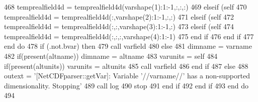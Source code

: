 \begin{DoxyCode}
468                             temprealfield4d = temprealfield4d(varshape(1):1:-1,:,:,:)
469                         \textcolor{keywordflow}{elseif} (self%
470                             temprealfield4d = temprealfield4d(:,varshape(2):1:-1,:,:)
471                         \textcolor{keywordflow}{elseif} (self%
472                             temprealfield4d = temprealfield4d(:,:,varshape(3):1:-1,:)
473                         \textcolor{keywordflow}{elseif} (self%
474                             temprealfield4d = temprealfield4d(:,:,:,varshape(4):1:-1)
475 \textcolor{keywordflow}{                        end if}
476 \textcolor{keywordflow}{                    end if}
477 \textcolor{keywordflow}{                end do}
478                 \textcolor{keywordflow}{if} (.not.bvar) \textcolor{keywordflow}{then}
479                     \textcolor{keyword}{call }varfield%
480                 \textcolor{keywordflow}{else}
481                     dimname = varname
482                     \textcolor{keywordflow}{if}(\textcolor{keyword}{present}(altname)) dimname = altname
483                     varunits = self%
484                     \textcolor{keywordflow}{if}(\textcolor{keyword}{present}(altunits)) varunits = altunits
485                     \textcolor{keyword}{call }varfield%
486 \textcolor{keywordflow}{                end if}
487             \textcolor{keywordflow}{else}
488                 outext = \textcolor{stringliteral}{'[NetCDFparser::getVar]: Variable '}//varname//\textcolor{stringliteral}{' has a non-supported
       dimensionality. Stopping'}
489                 \textcolor{keyword}{call }log%
490                 stop
491 \textcolor{keywordflow}{            end if}
492 \textcolor{keywordflow}{        end if}
493 \textcolor{keywordflow}{    end do}
494 
\end{DoxyCode}
\mbox{\label{namespacenetcdfparser__mod_a0aea819b8a474ce2f4840d0bc44e95ec}} 
